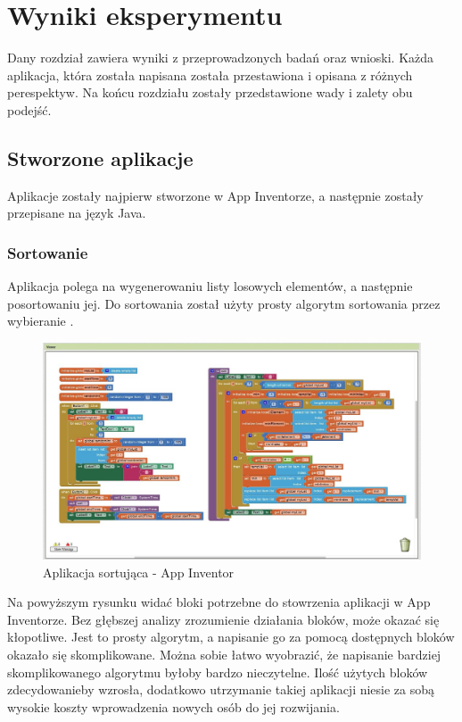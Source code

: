 \chapter{Wyniki eksperymentu}
\label{c5}

Dany rozdział zawiera wyniki z przeprowadzonych badań oraz wnioski. Każda aplikacja, która została napisana została przestawiona i opisana z różnych perespektyw. Na końcu rozdziału zostały przedstawione wady i zalety obu podejść.

\section{Stworzone aplikacje}

Aplikacje zostały najpierw stworzone w App Inventorze, a następnie zostały przepisane na język Java.

\subsection{Sortowanie}

Aplikacja polega na wygenerowaniu listy losowych elementów, a następnie posortowaniu jej. Do sortowania został użyty prosty algorytm sortowania przez wybieranie .

\begin{figure}[th] 
\centering\includegraphics[width=15cm]{figures/apps/sort}
\caption{Aplikacja sortująca - App Inventor}
\end{figure}

Na powyższym rysunku widać bloki potrzebne do stowrzenia aplikacji w App Inventorze. Bez głębszej analizy zrozumienie działania bloków, może okazać się kłopotliwe. Jest to prosty algorytm, a napisanie go za pomocą dostępnych bloków okazało się skomplikowane. Można sobie łatwo wyobrazić, że napisanie bardziej skomplikowanego algorytmu byłoby bardzo nieczytelne. Ilość użytych bloków zdecydowanieby wzrosła, dodatkowo utrzymanie takiej aplikacji niesie za sobą wysokie koszty wprowadzenia nowych osób do jej rozwijania.

